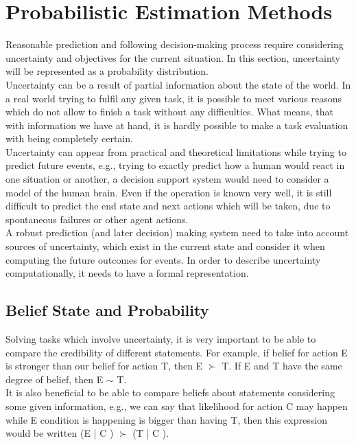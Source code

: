 \section{Probabilistic Estimation Methods}

Reasonable prediction and following decision-making process require considering uncertainty and objectives for the current situation. In this section, uncertainty will be represented as a probability distribution. \\

Uncertainty can be a result of partial information about the state of the world. In a real world trying to fulfil any given task, it is possible to meet various reasons which do not allow to finish a task without any difficulties. What means, that with information we have at hand, it is hardly possible to make a task evaluation with being completely certain. \\

Uncertainty can appear from practical and theoretical limitations while trying to predict future events, e.g., trying to exactly predict how a human would react in one situation or another, a decision support system would need to consider a model of the human brain. Even if the operation is known very well, it is still difficult to predict the end state and next actions which will be taken, due to spontaneous failures or other agent actions. \\

A robust prediction (and later decision) making system need to take into account sources of uncertainty, which exist in the current state and consider it when computing the future outcomes for events. In order to describe uncertainty
computationally, it needs to have a formal representation. 

\subsection{Belief State and Probability}

Solving tasks which involve uncertainty, it is very important to be able to compare the credibility of different statements. For example, if belief for action E is stronger than our belief for action T, then E $\succ$ T. If E and T have the same degree of belief, then E $\sim$ T. \\

It is also beneficial to be able to compare beliefs about statements considering some given information, e.g., we can say that likelihood for action C may happen while E condition is happening is bigger than having T, then this expression would be written (E | C ) $\succ$ (T | C ). \\

